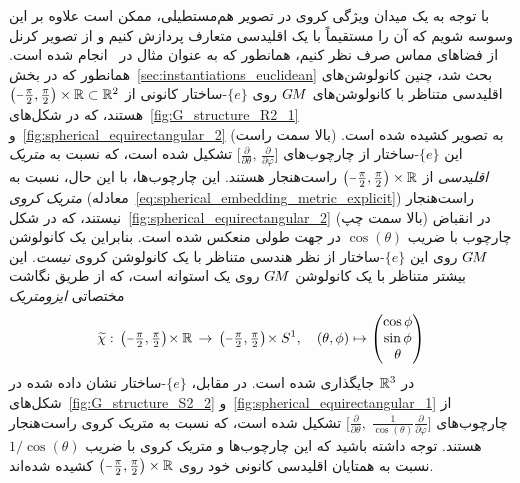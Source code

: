 با توجه به یک میدان ویژگی کروی در تصویر هم‌مستطیلی، ممکن است
علاوه بر این
وسوسه شویم که آن را مستقیماً با یک  اقلیدسی متعارف پردازش کنیم و از تصویر کرنل از فضاهای مماس صرف نظر کنیم، همانطور که به عنوان مثال در~\cite{lai2017semantic,hu2017spherical} انجام شده است.
همانطور که در بخش~\ref{sec:instantiations_euclidean} بحث شد، چنین کانولوشن‌های اقلیدسی متناظر با کانولوشن‌های $G\mkern-1.4muM$ روی $\{e\}$-ساختار کانونی از $\big(\minus\frac{\pi}{2}, \frac{\pi}{2}\big) \times \R \subset \R^2$ هستند، که در شکل‌های~\ref{fig:G_structure_R2_1} و~\ref{fig:spherical_equirectangular_2} (بالا سمت راست) به تصویر کشیده شده است.
این $\{e\}$-ساختار از چارچوب‌های 
$\big[ \frac{\partial}{\partial\theta} ,\, \frac{\partial}{\partial\varphi} \big]$
تشکیل شده است، که نسبت به \emph{متریک اقلیدسی} از $\big(\minus\frac{\pi}{2}, \frac{\pi}{2}\big) \times \R$ راست‌هنجار هستند.
این چارچوب‌ها، با این حال، نسبت به \emph{متریک کروی} (معادله~\eqref{eq:spherical_embedding_metric_explicit}) راست‌هنجار نیستند، که در شکل~\ref{fig:spherical_equirectangular_2} (بالا سمت چپ) در انقباض چارچوب با ضریب $\cos(\theta)$ در جهت طولی منعکس شده است.
بنابراین یک کانولوشن $G\mkern-1.4muM$ روی این $\{e\}$-ساختار از نظر هندسی متناظر با یک کانولوشن کروی \emph{نیست}.
این بیشتر متناظر با یک کانولوشن $G\mkern-1.4muM$ روی یک استوانه است، که از طریق نگاشت مختصاتی \emph{ایزومتریک}
\begin{align}\label{eq:cylindrical_coords}
    \widetilde{\chi}:\, \big( {\textstyle \minus\frac{\pi}{2}, \frac{\pi}{2}} \big) \!\times \R
    \,\to\, \big( {\textstyle \minus\frac{\pi}{2}, \frac{\pi}{2}} \big) \!\times S^1,
    \quad (\theta,\phi) \mapsto
    \begin{pmatrix}
        \cos{\phi} \\
        \sin{\phi} \\
        \theta
    \end{pmatrix}
\end{align}
در $\mathbb{R}^3$ جایگذاری شده است.
در مقابل، $\{e\}$-ساختار نشان داده شده در شکل‌های~\ref{fig:G_structure_S2_2} و~\ref{fig:spherical_equirectangular_1} از چارچوب‌های
$\big[ \frac{\partial}{\partial\theta} ,\; \frac{1}{\cos(\theta)} \frac{\partial}{\partial\varphi} \big]$
تشکیل شده است، که نسبت به متریک کروی راست‌هنجار هستند.
توجه داشته باشید که این چارچوب‌ها و متریک کروی با ضریب $1/\cos(\theta)$ نسبت به همتایان اقلیدسی کانونی خود روی $\big( {\textstyle \minus\frac{\pi}{2}, \frac{\pi}{2}} \big) \times \R$ کشیده شده‌اند.


